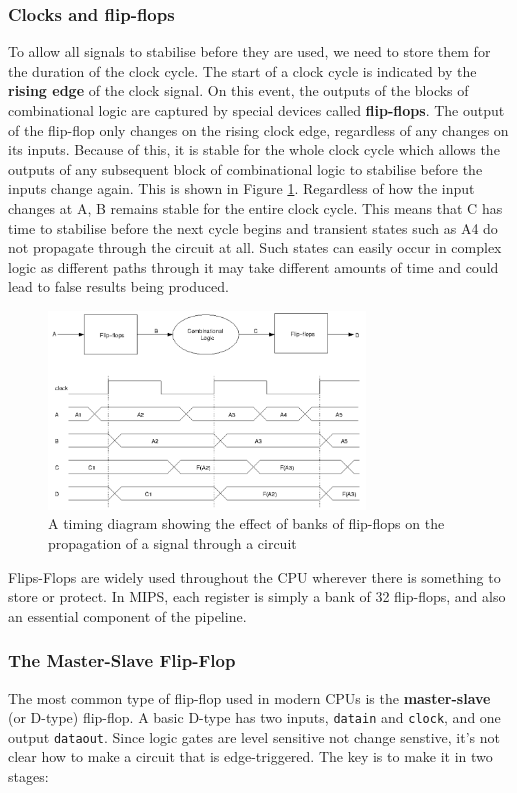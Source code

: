 \documentclass{article}
\begin{document}
	\subsubsection{Clocks and flip-flops}
	To allow all signals to stabilise before they are used, we need to store them for the duration of the clock cycle. The start of a clock cycle is indicated by the \textbf{rising edge} of the clock signal. On this event, the outputs of the blocks of combinational logic are captured by special devices called \textbf{flip-flops}. The output of the flip-flop only changes on the rising clock edge, regardless of any changes on its inputs. Because of this, it is stable for the whole clock cycle which allows the outputs of any subsequent block of combinational logic to stabilise before the inputs change again. This is shown in Figure \ref{fig:flip flops}. Regardless of how the input changes at A, B remains stable for the entire clock cycle. This means that C has time to stabilise before the next cycle begins and transient states such as A4 do not propagate through the circuit at all. Such states can easily occur in complex logic as different paths through it may take different amounts of time and could lead to false results being produced.
	
	\begin{figure}[ht]
		\centering
		\includegraphics[width=0.75\textwidth]{flip_flops}
		\caption{A timing diagram showing the effect of banks of ﬂip-ﬂops on the propagation of a signal through a circuit}
		\label{fig:flip flops}
	\end{figure}
	
	Flips-Flops are widely used throughout the CPU wherever there is something to store or protect. In MIPS, each register is simply a bank of 32 flip-flops, and also an essential component of the pipeline.
	
	\subsubsection{The Master-Slave Flip-Flop}
	The most common type of flip-flop used in modern CPUs is the \textbf{master-slave} (or D-type) flip-flop. A basic D-type has two inputs, \texttt{datain} and \texttt{clock}, and one output \texttt{dataout}. Since logic gates are level sensitive not change senstive, it's not clear how to make a circuit that is edge-triggered. The key is to make it in two stages:
	
\end{document}
